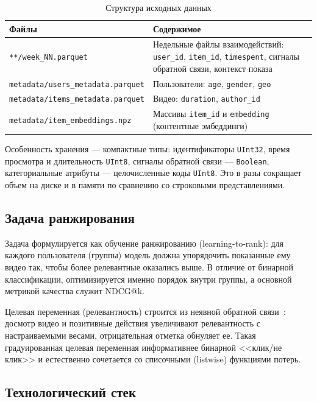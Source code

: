 \begin{table}[H]
\centering
\caption{Структура исходных данных}
\label{tab:raw-files}
\small
\begin{tabularx}{\textwidth}{@{}l X@{}}
\toprule
\textbf{Файлы} & \textbf{Содержимое} \\
\midrule
\texttt{**/week\_NN.parquet} & Недельные файлы взаимодействий: \texttt{user\_id}, \texttt{item\_id}, \texttt{timespent}, сигналы обратной связи, контекст показа \\
\texttt{metadata/users\_metadata.parquet} & Пользователи: \texttt{age}, \texttt{gender}, \texttt{geo} \\
\texttt{metadata/items\_metadata.parquet} & Видео: \texttt{duration}, \texttt{author\_id} \\
\texttt{metadata/item\_embeddings.npz} & Массивы \texttt{item\_id} и \texttt{embedding} (контентные эмбеддинги) \\
\bottomrule
\end{tabularx}
\end{table}

Особенность хранения --- компактные типы: идентификаторы \texttt{UInt32}, время просмотра и длительность \texttt{UInt8}, сигналы обратной связи --- \texttt{Boolean}, категориальные атрибуты --- целочисленные коды \texttt{UInt8}.
Это в разы сокращает объем на диске и в памяти по сравнению со строковыми представлениями.

\subsection{Задача ранжирования}

Задача формулируется как обучение ранжированию (learning-to-rank): для каждого пользователя (группы) модель должна упорядочить показанные ему видео так, чтобы более релевантные оказались выше.
В отличие от бинарной классификации, оптимизируется именно порядок внутри группы, а основной метрикой качества служит NDCG@k.

Целевая переменная (релевантность) строится из неявной обратной связи~\cite{implicit-cf}: досмотр видео и позитивные действия увеличивают релевантность с настраиваемыми весами, отрицательная отметка обнуляет ее.
Такая градуированная целевая переменная информативнее бинарной <<клик/не клик>> и естественно сочетается со списочными (listwise) функциями потерь.

\subsection{Технологический стек}

